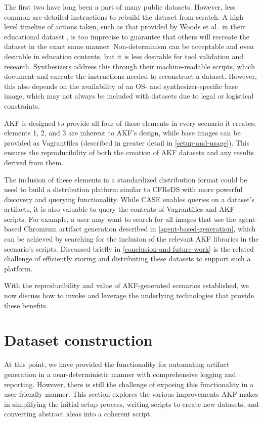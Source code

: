 The first two have long been a part of many public datasets. However,
less common are detailed instructions to rebuild the dataset from
scratch. A high-level timeline of actions taken, such as that provided
by Woods et al.~in their educational dataset
\citep{woodsCreatingRealisticCorpora2011}, is too imprecise to
guarantee that others will recreate the dataset in the exact same
manner. Non-determinism can be acceptable and even desirable in
education contexts, but it is less desirable for tool validation and
research. Synthesizers address this through their machine-readable
scripts, which document and execute the instructions needed to
reconstruct a dataset. However, this also depends on the availability of
an OS- and synthesizer-specific base image, which may not always be
included with datasets due to legal or logistical constraints.

AKF is designed to provide all four of these elements in every scenario
it creates; elements 1, 2, and 3 are inherent to AKF's design, while
base images can be provided as Vagrantfiles (described in greater detail
in \autoref{setup-and-usage}). This ensures the reproducibility of both
the creation of AKF datasets and any results derived from them.

The inclusion of these elements in a standardized distribution format
could be used to build a distribution platform similar to CFReDS with
more powerful discovery and querying functionality. While CASE enables
queries on a dataset's artifacts, it is also valuable to query the
contents of Vagrantfiles and AKF scripts. For example, a user may want
to search for all images that use the agent-based Chromium artifact
generation described in \autoref{agent-based-generation}, which can be
achieved by searching for the inclusion of the relevant AKF libraries in
the scenario's scripts. Discussed briefly in \autoref{conclusion-and-future-work} is the related challenge of efficiently storing and
distributing these datasets to support such a platform.

With the reproducibility and value of AKF-generated scenarios
established, we now discuss how to invoke and leverage the underlying
technologies that provide these benefits.

\section{Dataset construction}\label{dataset-construction}

At this point, we have provided the functionality for automating
artifact generation in a near-deterministic manner with comprehensive
logging and reporting. However, there is still the challenge of exposing
this functionality in a user-friendly manner. This section explores the
various improvements AKF makes in simplifying the initial setup process,
writing scripts to create new datasets, and converting abstract ideas
into a coherent script.

